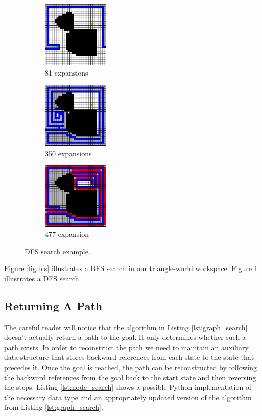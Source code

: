 \begin{figure}
\begin{center}
    \begin{subfigure}[t]{0.3\textwidth}
      \includegraphics[width=1.25in]{planning/figs/dfs_0081.pdf}
       \caption{81 expansions}
    \end{subfigure}
    \begin{subfigure}[t]{0.3\textwidth}
      \includegraphics[width=1.25in]{planning/figs/dfs_0350.pdf}
       \caption{350 expansions}
    \end{subfigure}
    \begin{subfigure}[t]{0.3\textwidth}
      \includegraphics[width=1.25in]{planning/figs/dfs_0477.pdf}
       \caption{477 expansion}
    \end{subfigure}

\end{center}
\caption{DFS search example.}
\label{fig:dfs}
\end{figure}


Figure \ref{fig:bfs} illustrates a BFS search in our triangle-world
workspace.  Figure \ref{fig:dfs} illustrates a DFS search.


\subsection{Returning A Path}

The careful reader will notice that the algorithm in Listing
\ref{lst:graph_search} doesn't actually return a path to the goal.  It
only determines whether such a path exists.  In order to reconstruct
the path we need to maintain an auxiliary data structure that stores
backward references from each state to the state that precedes it.
Once the goal is reached, the path can be reconstructed by following
the backward references from the goal back to the start state and then
reversing the steps.  Listing \ref{lst:node_search} shows a possible
Python implementation of the necessary data type and an appropriately
updated version of the algorithm from Listing \ref{lst:graph_search}.


